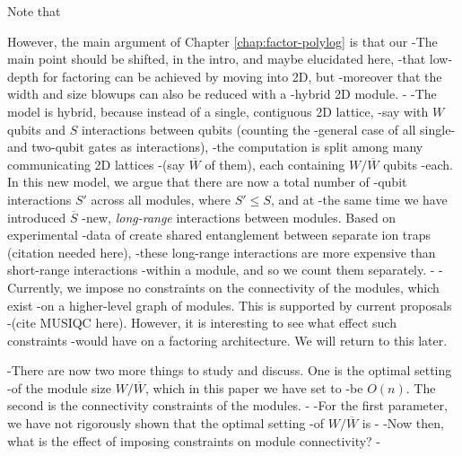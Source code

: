 Note that 

 However, the main argument
of Chapter \ref{chap:factor-polylog} is that our 
-The main point should be shifted, in the intro, and maybe elucidated here,
-that low-depth for factoring can be achieved by moving into 2D, but
-moreover that the width and size blowups can also be reduced with a
-hybrid 2D module.
-
-The model is hybrid, because instead of a single, contiguous 2D lattice,
-say with $W$ qubits and $S$ interactions between qubits (counting the
-general case of all single- and two-qubit gates as interactions),
-the computation is split among many communicating 2D lattices
-(say $\overline{W}$ of them), each containing $W/\overline{W}$ qubits
-each. In this new model, we argue that there are now a total number of
-qubit interactions $S'$ across all modules, where $S' \le S$, and at
-the same time we have introduced $\overline{S}$
-new, \emph{long-range} interactions between modules. Based on experimental
-data of create shared entanglement between separate ion traps (citation needed here),
-these long-range interactions are more expensive than short-range interactions
-within a module, and so we count them separately.
-
-Currently, we impose no constraints on the connectivity of the modules, which exist
-on a higher-level graph of modules. This is supported by current proposals
-(cite MUSIQC here). However, it is interesting to see what effect such constraints
-would have on a factoring architecture. We will return to this later.

-There are now two more things to study and discuss. One is the optimal setting
-of the module size $W/\overline{W}$, which in this paper we have set to
-be $O(n)$. The second is the connectivity constraints of the modules.
-
-For the first parameter, we have not rigorously shown that the optimal setting
-of $W / \overline{W}$ is 
-
-Now then, what is the effect of imposing constraints on module connectivity?
-

